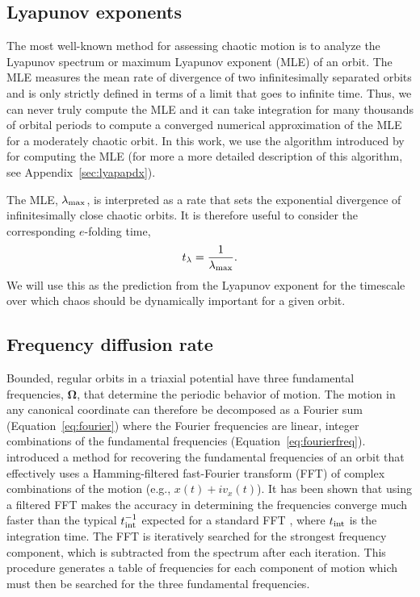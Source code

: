 \documentclass[letterpaper,12pt,preprint]{aastex}
\newcommand{\bs}[1]{\boldsymbol{#1}}
\newcommand{\inttime}{t_{\rm int}}
\begin{document}
\subsection{Lyapunov exponents} \label{sec:lyap}

The most well-known method for assessing chaotic motion is to analyze the Lyapunov spectrum or maximum Lyapunov exponent (MLE) of an orbit. The MLE measures the mean rate of divergence of two infinitesimally separated orbits and is only strictly defined in terms of a limit that goes to infinite time. Thus, we can never truly compute the MLE and it can take integration for many thousands of orbital periods to compute a converged numerical approximation of the MLE for a moderately chaotic orbit. In this work, we use the algorithm introduced by \cite{wolf85} for computing the MLE (for more a more detailed description of this algorithm, see Appendix~\ref{sec:lyapapdx}).

The MLE, $\lambda_{\rm max}$, is interpreted as a rate that sets the exponential divergence of infinitesimally close chaotic orbits. It is therefore useful to consider the corresponding $e$-folding time, 
\begin{equation}
	t_{\rm \lambda} = \frac{1}{\lambda_{\rm max}}.
\end{equation}
We will use this as the prediction from the Lyapunov exponent for the timescale over which chaos should be dynamically important for a given orbit. 

\subsection{Frequency diffusion rate}\label{sec:naff}

Bounded, regular orbits in a triaxial potential have three fundamental frequencies, $\bs{\Omega}$, that determine the periodic behavior of motion. The motion in any canonical coordinate can therefore be decomposed as a Fourier sum (Equation~\ref{eq:fourier}) where the Fourier frequencies are linear, integer combinations of the fundamental frequencies (Equation~\ref{eq:fourierfreq}). \cite{laskar93} introduced a method for recovering the fundamental frequencies of an orbit that effectively uses a Hamming-filtered fast-Fourier transform (FFT) of complex combinations of the motion (e.g., $x(t) + i v_x(t)$). It has been shown that using a filtered FFT makes the accuracy in determining the frequencies converge much faster than the typical $\inttime^{-1}$ expected for a standard FFT \citep{laskar99}, where $\inttime$ is the integration time. The FFT is iteratively searched for the strongest frequency component, which is subtracted from the spectrum after each iteration. This procedure generates a table of frequencies for each component of motion which must then be searched for the three fundamental frequencies.
\end{document}
